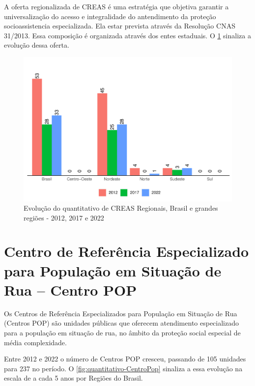 \documentclass[
  brazilian]{report}
\begin{document}
A oferta regionalizada de CREAS é uma estratégia que objetiva garantir a
universalização do acesso e integralidade do antendimento da proteção
socioassistencia especializada. Ela estar prevista através da Resolução
CNAS 31/2013. Essa composição é organizada através dos entes estaduais.
O \cref{fig:creas-regionais} sinaliza a evolução dessa oferta.

\begin{figure}
\includegraphics{Censo-SUAS-2022_files/figure-latex/creas-regionais-1} \caption[Evolução do quantitativo de CREAS Regionais, Brasil e grandes regiões - 2012, 2017 e 2022]{Evolução do quantitativo de CREAS Regionais, Brasil e grandes regiões - 2012, 2017 e 2022}\label{fig:creas-regionais}
\end{figure}

\hypertarget{centro-de-referuxeancia-especializado-para-populauxe7uxe3o-em-situauxe7uxe3o-de-rua-centro-pop}{%
\section{Centro de Referência Especializado para População em Situação
de Rua -- Centro
POP}\label{centro-de-referuxeancia-especializado-para-populauxe7uxe3o-em-situauxe7uxe3o-de-rua-centro-pop}}

Os Centros de Referência Especializados para População em Situação de
Rua (Centros POP) são unidades públicas que oferecem atendimento
especializado para a população em situação de rua, no âmbito da proteção
social especial de média complexidade.

Entre 2012 e 2022 o número de Centros POP cresceu, passando de 105
unidades para 237 no período. O \cref{fig:quantitativo-CentroPop}
sinaliza a essa evolução na escala de a cada 5 anos por Regiões do
Brasil.
\end{document}
